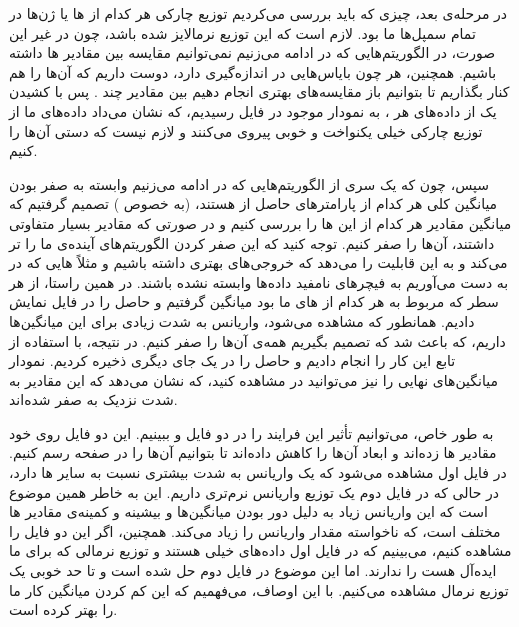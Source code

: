 \documentclass[12pt,onecolumn,a4paper]{article}
\begin{document}
در مرحله‌ی بعد، چیزی که باید بررسی می‌کردیم توزیع چارکی هر کدام از ها یا ژن‌ها در تمام سمپل‌ها ما بود. لازم است که این توزیع نرمالایز شده باشد، چون در غیر این صورت، در الگوریتم‌هایی که در ادامه می‌زنیم نمی‌توانیم مقایسه بین مقادیر ها داشته باشیم. همچنین، هر  چون بایاس‌هایی در اندازه‌گیری دارد، دوست داریم که آن‌ها را هم کنار بگذاریم تا بتوانیم باز مقایسه‌های بهتری انجام دهیم بین مقادیر چند . پس با کشیدن یک  از داده‌های هر ، به نمودار موجود در فایل  رسیدیم، که نشان می‌داد داده‌های ما از توزیع چارکی خیلی یکنواخت و خوبی پیروی می‌کنند و لازم نیست که دستی آن‌ها را  کنیم.

سپس، چون که یک سری از الگوریتم‌هایی که در ادامه می‌زنیم وابسته به صفر بودن میانگین کلی هر کدام از پارامتر‌های حاصل از  هستند، (به خصوص ) تصمیم گرفتیم که میانگین مقادیر هر کدام از این ها را بررسی کنیم و در صورتی که مقادیر بسیار متفاوتی داشتند، آن‌ها را صفر کنیم. توجه کنید که این صفر کردن الگوریتم‌های آینده‌ی ما را تر می‌کند و به این قابلیت را می‌دهد که خروجی‌های بهتری داشته باشیم و مثلاً هایی که در  به دست می‌آوریم به فیچر‌های نامفید داده‌ها وابسته نشده باشند. در همین راستا، از هر سطر که مربوط به هر کدام از های ما بود میانگین گرفتیم و حاصل را در فایل  نمایش دادیم. همانطور که مشاهده می‌شود، واریانس به شدت زیادی برای این میانگین‌ها داریم، که باعث شد که تصمیم بگیریم همه‌ی آن‌ها را صفر کنیم. در نتیجه، با استفاده از تابع  این کار را انجام دادیم و حاصل را در یک جای دیگری ذخیره کردیم. نمودار میانگین‌های نهایی را نیز می‌توانید در  مشاهده کنید، که نشان می‌دهد که این مقادیر به شدت نزدیک به صفر شده‌اند.

به طور خاص، می‌توانیم تأثیر این فرایند را در دو فایل  و  ببینیم. این دو فایل روی خود مقادیر ها  زده‌اند و ابعاد آن‌ها را کاهش داده‌اند تا بتوانیم آن‌ها را در صفحه رسم کنیم. در فایل اول مشاهده می‌شود که  یک واریانس به شدت بیشتری نسبت به سایر ها دارد، در حالی که در فایل دوم یک توزیع واریانس نرم‌تری داریم. این به خاطر همین موضوع است که این واریانس زیاد به دلیل دور بودن میانگین‌ها و بیشینه و کمینه‌ی مقادیر ها مختلف است، که ناخواسته مقدار واریانس را زیاد می‌کند. همچنین، اگر  این دو فایل را مشاهده کنیم، می‌بینیم که در فایل اول داده‌های خیلی  هستند و توزیع نرمالی که برای ما ایده‌آل هست را ندارند. اما این موضوع در فایل دوم حل شده است و تا حد خوبی یک توزیع نرمال مشاهده می‌کنیم. با این اوصاف، می‌فهمیم که این کم کردن میانگین کار ما را بهتر کرده است.
\end{document}
